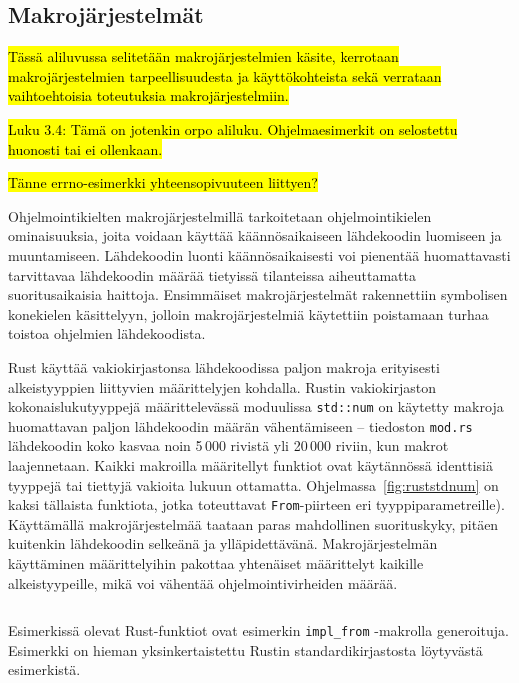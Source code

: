 \subsection{Makrojärjestelmät}

\hl{Tässä aliluvussa selitetään makrojärjestelmien käsite, kerrotaan
makrojärjestelmien tarpeellisuudesta ja käyttökohteista sekä verrataan
vaihtoehtoisia toteutuksia makrojärjestelmiin.}

\hl{ Luku 3.4: Tämä on jotenkin orpo aliluku. Ohjelmaesimerkit on selostettu
huonosti tai ei ollenkaan. }

\hl{Tänne errno-esimerkki yhteensopivuuteen liittyen?}

Ohjelmointikielten makrojärjestelmillä tarkoitetaan ohjelmointikielen
ominaisuuksia, joita voidaan käyttää käännösaikaiseen lähdekoodin luomiseen ja
muuntamiseen. Lähdekoodin luonti käännösaikaisesti voi pienentää huomattavasti
tarvittavaa lähdekoodin määrää tietyissä tilanteissa aiheuttamatta
suoritusaikaisia haittoja. Ensimmäiset makrojärjestelmät rakennettiin
symbolisen konekielen käsittelyyn, jolloin makrojärjestelmiä käytettiin
poistamaan turhaa toistoa ohjelmien lähdekoodista.

Rust käyttää vakiokirjastonsa lähdekoodissa paljon makroja erityisesti
alkeistyyppien liittyvien määrittelyjen kohdalla. Rustin vakiokirjaston
kokonaislukutyyppejä määrittelevässä moduulissa \texttt{std::num} on käytetty
makroja huomattavan paljon lähdekoodin määrän vähentämiseen -- tiedoston
\texttt{mod.rs} lähdekoodin koko kasvaa noin 5\,000 rivistä yli 20\,000 riviin,
kun makrot laajennetaan. Kaikki makroilla määritellyt funktiot ovat käytännössä
identtisiä tyyppejä tai tiettyjä vakioita lukuun ottamatta.
Ohjelmassa~\ref{fig:ruststdnum} on kaksi tällaista funktiota, jotka toteuttavat
\texttt{From}-piirteen eri tyyppiparametreille). Käyttämällä makrojärjestelmää
taataan paras mahdollinen suorituskyky, pitäen kuitenkin lähdekoodin selkeänä
ja ylläpidettävänä. Makrojärjestelmän käyttäminen määrittelyihin pakottaa
yhtenäiset määrittelyt kaikille alkeistyypeille, mikä voi vähentää
ohjelmointivirheiden määrää.

\begin{listing}[ht!]
    \inputminted{Rust}{koodi/ruststdnum.rs}
    \caption{Esimerkissä olevat Rust-funktiot ovat esimerkin
    \texttt{impl\_from} -makrolla generoituja. Esimerkki on hieman
    yksinkertaistettu Rustin standardikirjastosta löytyvästä esimerkistä.}
    \label{fig:ruststdnum}
\end{listing}

